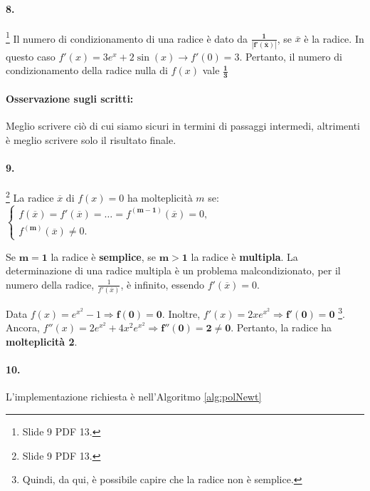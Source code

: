 \paragraph{8.}\footnote{Slide 9 PDF 13.} Il numero di condizionamento di una radice è dato da $\boldsymbol{\frac{1}{|f'(\overline{x})|}}$, se $\overline{x}$ è la radice. In questo caso $f'(x)=3e^x+2\sin{(x)}\rightarrow f'(0)=3$. Pertanto, il numero di condizionamento della radice nulla di $f(x)$ vale $\boldsymbol{\frac{1}{3}}$

\paragraph{Osservazione sugli scritti:} Meglio scrivere ciò di cui siamo sicuri in termini di passaggi intermedi, altrimenti è meglio scrivere solo il risultato finale.

\paragraph{9.}\footnote{Slide 9 PDF 13.} La radice $\overline{x}$ di $f(x)=0$ ha molteplicità $m$ se:
$\begin{cases}
	f(\overline{x})=f'(\overline{x})=\hdots=f^{(\boldsymbol{m-1})}(\overline{x})=0,\\
	f^{(\boldsymbol m)}(\overline{x})\neq 0.
\end{cases}$

\noindent Se $\boldsymbol{m=1}$ la radice è \textbf{semplice}, se $\boldsymbol{m>1}$ la radice è \textbf{multipla}. La determinazione di una radice multipla è un problema malcondizionato, per il numero della radice, $\frac{1}{f'(\overline{x})}$, è infinito, essendo $f'(\overline{x})=0$. 

\noindent Data $f(x)=e^{x^2}-1\Rightarrow\boldsymbol{f(0)=0}$. Inoltre, $f'(x)=2xe^{x^2}\Rightarrow\boldsymbol{f'(0)=0}$ \footnote{Quindi, da qui, è possibile capire che la radice non è semplice.}. Ancora, $f''(x)=2e^{x^2}+4x^2e^{x^2}\Rightarrow\boldsymbol{f''(0)=2\neq 0}.$ Pertanto, la radice ha \textbf{molteplicità 2}.

\paragraph{10.} L'implementazione richiesta è nell'Algoritmo \ref{alg:polNewt}

